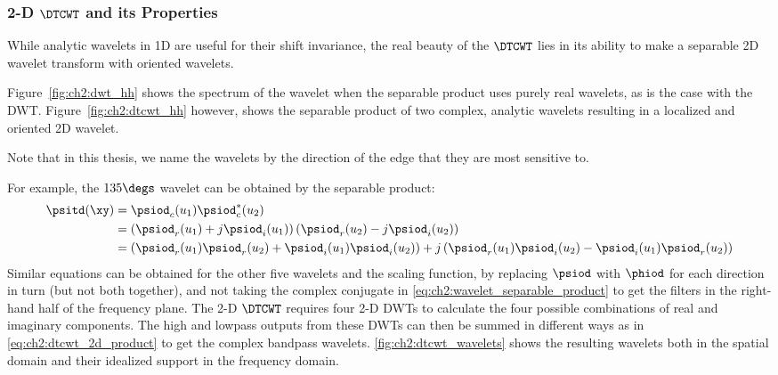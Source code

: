 \subsubsection{2-D $\DTCWT$ and its Properties}
  While analytic wavelets in 1D are useful for their shift invariance, the real
  beauty of the $\DTCWT$ lies in its ability to make a separable 2D wavelet
  transform with oriented wavelets. 
  
  Figure~\autoref{fig:ch2:dwt_hh} shows the spectrum of
  the wavelet when the separable product uses purely real wavelets, as is the
  case with the DWT\@. Figure~\autoref{fig:ch2:dtcwt_hh} however, shows the separable
  product of two complex, analytic wavelets resulting in a localized and
  oriented 2D wavelet. 

  Note that in this thesis, we name the wavelets by the direction of the edge
  that they are most sensitive to. 
  
  For example, the $135\degs$ wavelet can be obtained by the separable product:
  \begin{align}
    \psitd(\xy) &= \psiod_c(u_1) \psiod_c^*(u_2) \label{eq:ch2:wavelet_separable_product}\\
              &= \left(\psiod_r(u_1) + j\psiod_i(u_1)\right) 
                 \left(\psiod_r(u_2) - j\psiod_i(u_2)\right) \\
              &= \left(\psiod_r(u_1)\psiod_r(u_2) + \psiod_i(u_1)\psiod_i(u_2)\right) 
                +j \left(\psiod_r(u_1)\psiod_i(u_2) - \psiod_i(u_1)\psiod_r(u_2)\right) 
                \label{eq:ch2:dtcwt_2d_product}
  \end{align}
  Similar equations can be obtained for the other five wavelets and the scaling
  function, by replacing $\psiod$ with $\phiod$ for each direction in turn (but not both
  together), and not taking the complex conjugate
  in \eqref{eq:ch2:wavelet_separable_product} to get the filters in the
  right-hand half of the frequency plane. The 2-D $\DTCWT$ requires four 2-D
  DWTs to calculate the four possible combinations of real and imaginary
  components. The high and lowpass outputs from these DWTs can then be summed in
  different ways as in \eqref{eq:ch2:dtcwt_2d_product} to get the complex
  bandpass wavelets.  \autoref{fig:ch2:dtcwt_wavelets} shows the resulting
  wavelets both in the spatial domain and their idealized support in the
  frequency domain.

